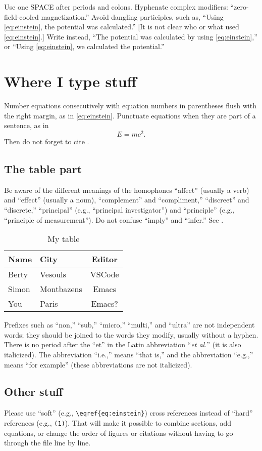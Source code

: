 \documentclass[11pt]{article}
\begin{document}
Use one SPACE after periods and colons. Hyphenate complex modifiers:
``zero-field-cooled magnetization.'' Avoid dangling participles, such as,
``Using \eqref{eq:einstein}, the potential was calculated.'' [It is not clear who or what
used \eqref{eq:einstein}.] Write instead, ``The potential was calculated by
using \eqref{eq:einstein},'' or
``Using \eqref{eq:einstein}, we calculated the potential.''


\section{Where I type stuff}
\label{sec:my-stuff}

Number equations consecutively with equation numbers in parentheses
flush with the right margin, as in \eqref{eq:einstein}. Punctuate
equations when they are part of a sentence, as in
\begin{equation}\label{eq:einstein}
  E=mc^2.
\end{equation}
Then do not forget to cite \cite{Saad2002_book}.

\subsection{The table part}
\label{sec:fig}

Be aware of the different meanings of the homophones ``affect'' (usually a
verb) and ``effect'' (usually a noun), ``complement'' and ``compliment,''
``discreet'' and ``discrete,'' ``principal'' (e.g., ``principal
investigator'') and ``principle'' (e.g., ``principle of measurement''). Do
not confuse ``imply'' and ``infer.'' See \cite{getdp-ieee1999}.
\begin{table}[!h]
  \centering
  \caption{My table}
  \label{tab:student}
  \begin{tabular}{ll|c}
    Name & City & Editor \\
    \hline
    Berty & Vesouls & VSCode \\
    Simon & Montbazens & Emacs \\
    You & Paris & Emacs?
  \end{tabular}
\end{table}
Prefixes such as ``non,'' ``sub,'' ``micro,'' ``multi,'' and ``ultra'' are
not independent words; they should be joined to the words they modify,
usually without a hyphen. There is no period after the ``et'' in the Latin
abbreviation ``\emph{et al.}'' (it is also italicized). The abbreviation ``i.e.,'' means
``that is,'' and the abbreviation ``e.g.,'' means ``for example'' (these
abbreviations are not italicized).


\subsection{Other stuff}
\label{sec:other}

Please use ``soft'' (e.g., \verb|\eqref{eq:einstein}|) cross references instead
of ``hard'' references (e.g., \verb|(1)|). That will make it possible
to combine sections, add equations, or change the order of figures or
citations without having to go through the file line by line.



\end{document}
